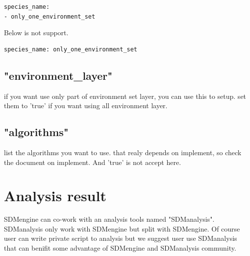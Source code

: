 \documentclass[10pt,a4paper]{report}
\begin{document}
\begin{lstlisting}
species_name:
- only_one_environment_set
\end{lstlisting}

Below is not support.

\begin{lstlisting}
species_name: only_one_environment_set
\end{lstlisting}

\subsection{"environment\_layer"}
if you want use only part of environment set layer, you can use this to setup. set them to 'true' if you want using all environment layer.

\subsection{"algorithms"}
list the algorithms you want to use. that realy depends on implement, so check the document on implement. And 'true' is not accept here.

\section{Analysis result}
SDMengine can co-work with an analysis tools named "SDManalysis". SDManalysis only work with SDMengine but split with SDMengine. Of course user can write private script to analysis but we suggest user use SDManalysis that can benifit some advantage of SDMengine and SDManalysis community.  
\end{document}
